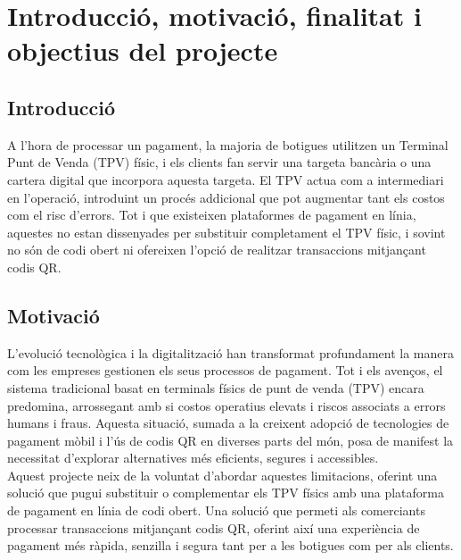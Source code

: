 \documentclass[a4paper,12pt,twoside]{ThesisStyle}
\begin{document}
\listoffigures

\listoftables

\mainmatter



\chapter{Introducció, motivació, finalitat i objectius del projecte}
\label{chp:intro}

\section{Introducció}
\label{sec:Introduccio}

A l'hora de processar un pagament, la majoria de botigues utilitzen un Terminal Punt de Venda (TPV) físic, i els clients fan servir una targeta bancària o una cartera digital que incorpora aquesta targeta. El TPV actua com a intermediari en l'operació, introduint un procés addicional que pot augmentar tant els costos com el risc d'errors. Tot i que existeixen plataformes de pagament en línia, aquestes no estan dissenyades per substituir completament el TPV físic, i sovint no són de codi obert ni ofereixen l'opció de realitzar transaccions mitjançant codis QR.

\section{Motivació}
\label{sec:Motivacio}

L’evolució tecnològica i la digitalització han transformat profundament la manera com les empreses gestionen els seus processos de pagament. Tot i els avenços, el sistema tradicional basat en terminals físics de punt de venda (TPV) encara predomina, arrossegant amb si costos operatius elevats i riscos associats a errors humans i fraus. Aquesta situació, sumada a la creixent adopció de tecnologies de pagament mòbil i l’ús de codis QR en diverses parts del món, posa de manifest la necessitat d’explorar alternatives més eficients, segures i accessibles.\\

Aquest projecte neix de la voluntat d’abordar aquestes limitacions, oferint una solució que pugui substituir o complementar els TPV físics amb una plataforma de pagament en línia de codi obert. Una solució que permeti als comerciants processar transaccions mitjançant codis QR, oferint així una experiència de pagament més ràpida, senzilla i segura tant per a les botigues com per als clients.\\
\end{document}
